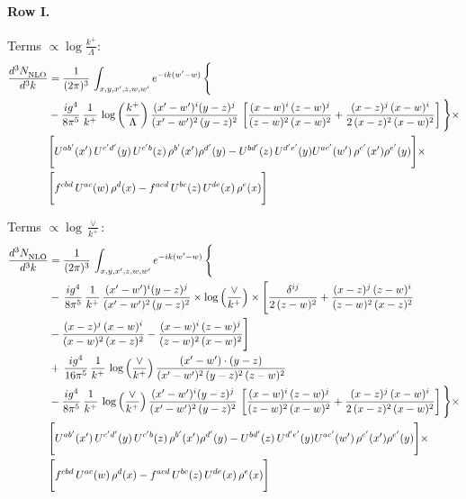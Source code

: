 \documentclass[10pt]{article}
\numberwithin{equation}{section}
\begin{document}
\paragraph{Row I.}
\noindent Terms $\propto\log\frac{k^+}{\Lambda}$:
\begin{align}
     \frac{d^{3}N_{\rm NLO}^{\rm}}{d^{3}k}  & =   \frac{1}{(2\pi)^{3}}\, \int_{x,y,x',z,w,w^{\prime}} e^{-ik(w^{\prime}-w)}\, \Bigg\{\notag \\
& -\frac{ig^{4}}{8\pi^{5}}\,\frac{1}{k^{+}}\,\log{\left(\frac{k^{+}}{\Lambda}\right)}\,\frac{(x'-w')^{i}(y-z)^{j}}{(x'-w')^{2}\,(y-z)^{2}}\,\left[\frac{(x-w)^{i}\,(z-w)^{j}}{(z-w)^{2}\,(x-w)^{2}}+\frac{(x-z)^{j}\,(x-w)^{i}}{2\,(x-z)^{2}\, (x-w)^{2}}\right]\Bigg\}\times \notag \\ &  \Bigg[U^{ab'}(x')\,U^{c'd'}(y)\,U^{c'b}(z)\,\rho^{b'}(x')\rho^{d'}(y)-U^{bd'}(z)\,U^{d'e'}(y)U^{ac'}(w')\,\rho^{c'}(x')\rho^{e'}(y)\Bigg]\times\notag \\ & \Bigg[f^{cbd}\,U^{ac}(w)\,\rho^{d}(x)-f^{acd}\, U^{bc}(z)\,U^{de}(x)\,\rho^{e}(x)\Bigg] \label{eq:J:G3I}
\end{align}

\noindent Terms $\propto\log\frac{\vee}{k^+}$:
\begin{align}
     \frac{d^{3}N_{\rm NLO}^{\rm}}{d^{3}k}  & =   \frac{1}{(2\pi)^{3}}\, \int_{x,y,x',z,w,w^{\prime}} e^{-ik(w^{\prime}-w)}\, \Bigg\{\notag \\
& -\,\frac{ig^{4}}{8\pi^{5}}\,\frac{1}{k^{+}}\,\frac{(x'-w')^{i}(y-z)^{j}}{(x'-w')^{2}\,(y-z)^{2}}\times \log{\left(\frac{\vee}{k^{+}}\right)}\times \Bigg[\frac{\delta^{ij}}{2\,(z-w)^{2}}+\frac{(x-z)^{j}\,(z-w)^{i}}{(z-w)^{2}\,(x-z)^{2}}\notag \\ & -\frac{(x-z)^{j}\,(x-w)^{i}}{(x-w)^{2}\,(x-z)^{2}}-\frac{(x-w)^{i}\,(z-w)^{j}}{(z-w)^{2}\,(x-w)^{2}}\Bigg] \notag \\
& +\,\frac{ig^{4}}{16\pi^{5}}\,\frac{1}{k^{+}}\,\log{\left(\frac{\vee}{k^{+}}\right)}\, \frac{(x'-w')\cdot (y-z)}{(x'-w')^{2}\,(y-z)^{2}\,(z-w)^{2}} \notag \\
& -\frac{ig^{4}}{8\pi^{5}}\,\frac{1}{k^{+}}\,\log{\left(\frac{\vee}{k^{+}}\right)}\,\frac{(x'-w')^{i}(y-z)^{j}}{(x'-w')^{2}\,(y-z)^{2}}\,\left[\frac{(x-w)^{i}\,(z-w)^{j}}{(z-w)^{2}\,(x-w)^{2}}+\frac{(x-z)^{j}\,(x-w)^{i}}{2\,(x-z)^{2}\, (x-w)^{2}}\right]\Bigg\}\times \notag \\ &  \Bigg[U^{ab'}(x')\,U^{c'd'}(y)\,U^{c'b}(z)\,\rho^{b'}(x')\rho^{d'}(y)-U^{bd'}(z)\,U^{d'e'}(y)U^{ac'}(w')\,\rho^{c'}(x')\rho^{e'}(y)\Bigg]\times\notag \\ & \Bigg[f^{cbd}\,U^{ac}(w)\,\rho^{d}(x)-f^{acd}\, U^{bc}(z)\,U^{de}(x)\,\rho^{e}(x)\Bigg] \label{eq:B:G3I}
\end{align}
\end{document}
